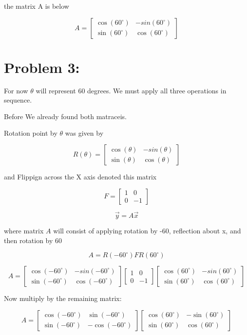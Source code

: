 \begin{enumerate}
\noindent the matrix A is below

\[
\boxed{
A = \begin{bmatrix}
    \cos(60^{\circ}) & -sin(60^{\circ}) \\
    \sin(60^{\circ}) & \cos(60^{\circ})
\end{bmatrix}}
\]

\section*{Problem 3:}


\noindent For now $\theta$ will represent 60 degrees. We must apply all three operations in sequence.

\noindent Before We already found both matraceis.

\noindent Rotation point by $\theta$ was given by

\[
R(\theta)=\begin{bmatrix}
    \cos(\theta) & -sin(\theta) \\
    \sin(\theta) & \cos(\theta)
\end{bmatrix}
\]

\noindent and Flippign across the X axis denoted this matrix

\[
F=\begin{bmatrix}
    1 & 0 \\
    0 & -1
\end{bmatrix}
\]

\[\vec{y} = A\vec{x}\]

\noindent where matrix $A$ will consist of applying rotation by -60, reflection about x, and then rotation by 60

\[
A = R(-60^{\circ})FR(60^{\circ})
\]

\[A = \begin{bmatrix}
    \cos(-60^{\circ}) & -sin(-60^{\circ}) \\
    \sin(-60^{\circ}) & \cos(-60^{\circ})
\end{bmatrix}
\begin{bmatrix}
    1 & 0 \\
    0 & -1
\end{bmatrix}
\begin{bmatrix}
    \cos(60^{\circ}) & -sin(60^{\circ}) \\
    \sin(60^{\circ}) & \cos(60^{\circ})
\end{bmatrix}\] 

\noindent Now multiply by the remaining matrix:

\[
A =
\begin{bmatrix}
\cos(-60^\circ) & \sin(-60^\circ) \\
\sin(-60^\circ) & -\cos(-60^\circ)
\end{bmatrix}
\begin{bmatrix}
\cos(60^\circ) & -\sin(60^\circ) \\
\sin(60^\circ) & \cos(60^\circ)
\end{bmatrix}
\]


\end{enumerate}
